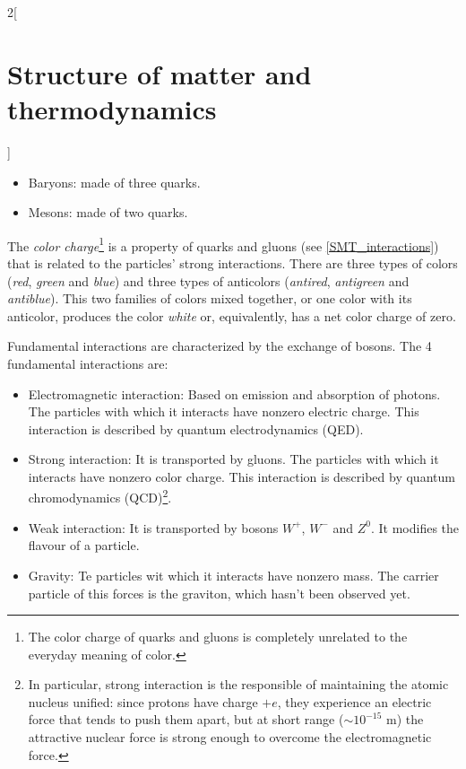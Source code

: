 \documentclass[../../../main.tex]{subfiles}
\begin{document}
\begin{multicols}{2}[\section{Structure of matter and thermodynamics}]
\begin{definition}[Hadron]
\begin{itemize}
            \item Baryons: made of three quarks.
            \item Mesons: made of two quarks.
        \end{itemize}
    \end{definition}
    \begin{definition}\label{SMT_color}
        The \textit{color charge}\footnote{The color charge of quarks and gluons is completely unrelated to the everyday meaning of color.} is a property of quarks and gluons (see \cref{SMT_interactions}) that is related to the particles' strong interactions. There are three types of colors (\textit{red}, \textit{green} and \textit{blue}) and three types of anticolors (\textit{antired}, \textit{antigreen} and \textit{antiblue}). This two families of colors mixed together, or one color with its anticolor, produces the color \textit{white} or, equivalently, has a net color charge of zero.
    \end{definition}
    \begin{definition}\label{SMT_interactions}
        Fundamental interactions are characterized by the exchange of bosons. The 4 fundamental interactions are:
        \begin{itemize}
            \item Electromagnetic interaction: Based on emission and absorption of photons. The particles with which it interacts have nonzero electric charge. This interaction is described by quantum electrodynamics (QED).
            \item Strong interaction: It is transported by gluons. The particles with which it interacts have nonzero color charge. This interaction is described by quantum chromodynamics (QCD)\footnote{In particular, strong interaction is the responsible of maintaining the atomic nucleus unified: since protons have charge $+e$, they experience an electric force that tends to push them apart, but at short range ($\sim10^{-15}\text{ m}$) the attractive nuclear force is strong enough to overcome the electromagnetic force.}.
            \item Weak interaction: It is transported by bosons $W^+$, $W^-$ and $Z^0$. It modifies the flavour of a particle.
            \item Gravity: Te particles wit which it interacts have nonzero mass. The carrier particle of this forces is the graviton, which hasn't been observed yet.
        \end{itemize}

\end{definition}
\end{multicols}
\end{document}

